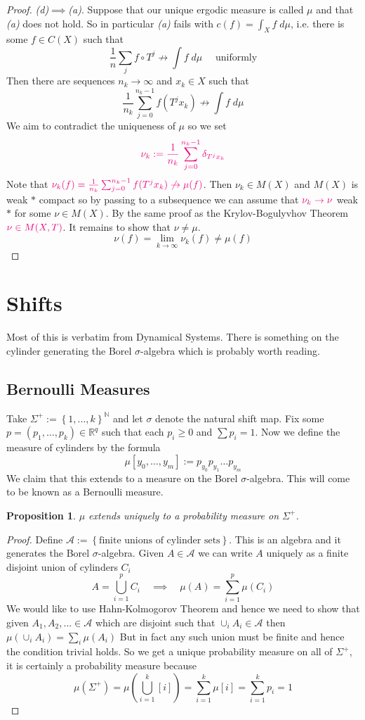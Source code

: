 \documentclass[11pt]{article}
\newcommand{\defeq}{:=}
\newcommand{\R}{\mathbb{R}}
\newcommand{\N}{\mathbb{N}}
\newcommand{\dm}{\;d\mu}
\newcommand{\mdf}[1]{{\color{RoyalBlue} #1}}
\newcommand{\highlight}[1]{{\color{RubineRed} #1}}
\newtheorem{prop}{Proposition}[section]
\begin{document}
\begin{proof}
\textit{(d)}$\implies$\textit{(a)}.
Suppose that our unique ergodic measure is called $\mu$ and that \textit{(a)} does not hold.
So in particular \textit{(a)} fails with $c(f) = \int_X f \dm$, i.e. \highlight{there is some $f\in C(X)$} such that
\[
	\frac{1}{n}\sum_{j}f\circ T^j \not \to \int f \dm \quad\text{ uniformly}
\]
Then there are \highlight{sequences $n_k\to \infty$ and $x_k\in X$} such that
\[
	\frac{1}{n_k}\sum_{j=0}^{n_k-1}f(T^jx_k) \not \to \int f \dm
\]
We aim to contradict the uniqueness of $\mu$ so we set 
\[
	\highlight{\nu_k \defeq \frac{1}{n_k}\sum_{j=0}^{n_k-1}\delta_{T^jx_k}}
\]
Note that $\highlight{ \nu_k(f) = \frac{1}{n_k}\sum_{j=0}^{n_k-1}f(T^jx_k)\not\to\mu(f) }$. 
Then $\nu_k\in M(X)$ and $M(X)$ is weak $\ast$ compact so by passing to a subsequence we can assume that $\highlight{\nu_k\to \nu}$ weak $\ast$ for some $\nu\in M(X)$.
By the same proof as the Krylov-Bogulyvhov Theorem $\highlight{\nu\in M(X, T)}$.
It remains to show that $\nu\neq \mu$.
\[
	\nu(f) =  \lim_{k\to\infty}\nu_k(f) \neq \mu (f)
\]
\end{proof}

\section{Shifts}
Most of this is verbatim from Dynamical Systems.
There is something on the cylinder generating the Borel $\sigma$-algebra which is probably worth reading.

\subsection{Bernoulli Measures}
Take $\Sigma^+ \defeq \left\{ 1, \dots, k\right\}^\N$ and let $\sigma$ denote the natural shift map.
Fix some $p=(p_1, \dots, p_k)\in \R^q$ such that each $p_i\geq 0$ and $\sum p_i=1$.
Now we define the measure of cylinders by the formula 
\[
	\mu[y_0, \dots, y_m] \defeq p_{y_0}p_{y_1}\dots p_{y_m}
\]
We claim that this extends to a measure on the Borel $\sigma$-algebra.
This will come to be known as a \mdf{Bernoulli measure}.

\begin{prop}
$\mu$ extends uniquely to a probability measure on $\Sigma^+$.
\end{prop}

\begin{proof}
Define $\mathcal{A}\defeq\left\{ \text{finite unions of cylinder sets}\right\}$.
This is an algebra and it generates the Borel $\sigma$-algebra.
Given $A\in\mathcal{A}$ we can write $A$ uniquely as a finite disjoint union of cylinders $C_i$
\[
	A = \bigcup_{i=1}^p C_i \quad \implies \quad \mu(A) = \sum_{i=1}^p \mu(C_i)
\]
We would like to use Hahn-Kolmogorov Theorem and hence we need to show that given $A_1, A_2, \dots \in \mathcal{A}$ which are disjoint such that $\cup_i A_i\in\mathcal{A}$ then $\mu(\cup_i A_i) = \sum_{i}\mu(A_i)$
But in fact any such union must be finite and hence the condition trivial holds.
So we get a unique probability measure on all of $\Sigma^+$, it is certainly a probability measure because
\[
	\mu(\Sigma^+) = \mu\left(\bigcup_{i=1}^k \left[ i\right] \right)= \sum_{i=1}^k \mu\left[ i\right] =\sum_{i=1}^k p_i = 1
\]
\end{proof}
\end{document}
